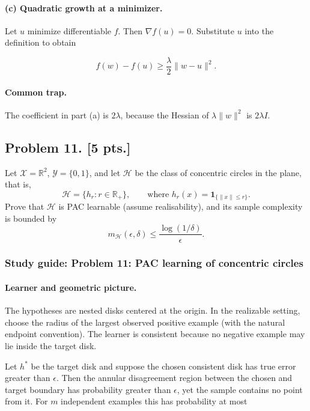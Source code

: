 \documentclass[11pt,a4paper]{article}
\begin{document}
\paragraph{(c) Quadratic growth at a minimizer.}

Let $u$ minimize differentiable $f$. Then $\nabla f(u)=0$. Substitute $u$ into the definition to obtain

\[
f(w)-f(u)
\geq
\frac{\lambda}{2}\|w-u\|^2.
\]

\paragraph{Common trap.}

The coefficient in part (a) is $2\lambda$, because the Hessian of $\lambda\|w\|^2$ is $2\lambda I$.



\subsection{Problem 11. [5 pts.]}
Let $\mathcal{X} = \mathbb{R}^{2}$, $\mathcal{Y} = \{0, 1\}$, and let $\mathcal{H}$ be the class of concentric circles in the plane, that is,
\[
\mathcal{H} = \{ h_r : r \in \mathbb{R}_{+} \}, \qquad \text{where } h_r(x) = \mathbf{1}_{\{\|x\| \le r\}}.
\]
Prove that $\mathcal{H}$ is PAC learnable (assume realisability), and its sample complexity is bounded by
\[
m_{\mathcal{H}}(\epsilon, \delta) \le \frac{\log(1/\delta)}{\epsilon}.
\]


\subsubsection{Study guide: Problem 11: PAC learning of concentric circles}

\paragraph{Learner and geometric picture.}

The hypotheses are nested disks centered at the origin. In the realizable setting, choose the radius of the largest observed positive example (with the natural endpoint convention). The learner is consistent because no negative example may lie inside the target disk.

Let $h^*$ be the target disk and suppose the chosen consistent disk has true error greater than $\epsilon$. Then the annular disagreement region between the chosen and target boundary has probability greater than $\epsilon$, yet the sample contains no point from it. For $m$ independent examples this has probability at most
\end{document}
